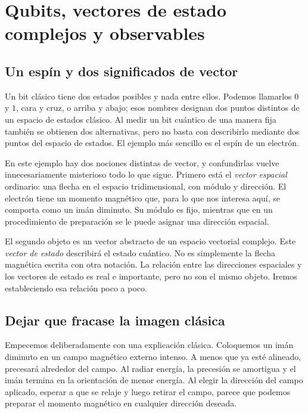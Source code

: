 \chapter{Qubits, vectores de estado complejos y observables}


\section{Un espín y dos significados de vector}

Un bit clásico tiene dos estados posibles y nada entre ellos. Podemos llamarlos \(0\) y \(1\), cara y cruz, o arriba y abajo; esos nombres designan dos puntos distintos de un espacio de estados clásico. Al medir un bit cuántico de una manera fija también se obtienen dos alternativas, pero no basta con describirlo mediante dos puntos del espacio de estados. El ejemplo más sencillo es el espín de un electrón.

En este ejemplo hay dos nociones distintas de vector, y confundirlas vuelve innecesariamente misterioso todo lo que sigue. Primero está el \emph{vector espacial} ordinario: una flecha en el espacio tridimensional, con módulo y dirección. El electrón tiene un momento magnético que, para lo que nos interesa aquí, se comporta como un imán diminuto. Su módulo es fijo, mientras que en un procedimiento de preparación se le puede asignar una dirección espacial.

El segundo objeto es un vector abstracto de un espacio vectorial complejo. Este \emph{vector de estado} describirá el estado cuántico. No es simplemente la flecha magnética escrita con otra notación. La relación entre las direcciones espaciales y los vectores de estado es real e importante, pero no son el mismo objeto. Iremos estableciendo esa relación poco a poco.

\section{Dejar que fracase la imagen clásica}

Empecemos deliberadamente con una explicación clásica. Coloquemos un imán diminuto en un campo magnético externo intenso. A menos que ya esté alineado, precesará alrededor del campo. Al radiar energía, la precesión se amortigua y el imán termina en la orientación de menor energía. Al elegir la dirección del campo aplicado, esperar a que se relaje y luego retirar el campo, parece que podemos preparar el momento magnético en cualquier dirección deseada.


